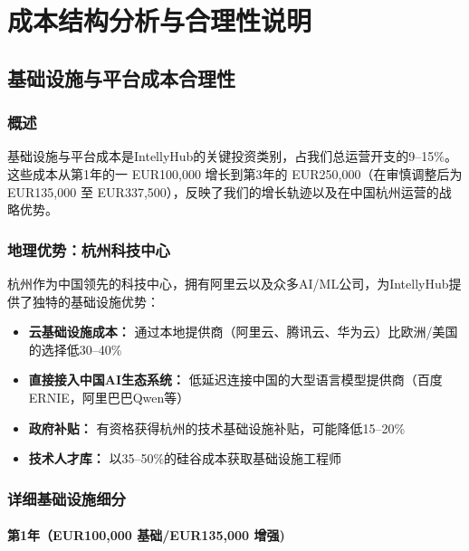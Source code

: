 \documentclass[11点, A4纸, 单面]{article}
\begin{document}


\restoregeometry
\endgroup

\section{成本结构分析与合理性说明}
\label{sec:cost-analysis}

\subsection{基础设施与平台成本合理性}

\subsubsection{概述}
基础设施与平台成本是IntellyHub的关键投资类别，占我们总运营开支的9--15\%。这些成本从第1年的一 EUR{100{,}000} 增长到第3年的 EUR{250{,}000}（在审慎调整后为 EUR{135{,}000} 至 EUR{337{,}500}），反映了我们的增长轨迹以及在中国杭州运营的战略优势。

\subsubsection{地理优势：杭州科技中心}
杭州作为中国领先的科技中心，拥有阿里云以及众多AI/ML公司，为IntellyHub提供了独特的基础设施优势：

\begin{itemize}
    \item \textbf{云基础设施成本：} 通过本地提供商（阿里云、腾讯云、华为云）比欧洲/美国的选择低30--40\%
    \item \textbf{直接接入中国AI生态系统：} 低延迟连接中国的大型语言模型提供商（百度ERNIE，阿里巴巴Qwen等）
    \item \textbf{政府补贴：} 有资格获得杭州的技术基础设施补贴，可能降低15--20\%
    \item \textbf{技术人才库：} 以35--50\%的硅谷成本获取基础设施工程师
\end{itemize}

\subsubsection{详细基础设施细分}

\paragraph{第1年（EUR{100{,}000} 基础/EUR{135{,}000} 增强)} 
\end{document}
